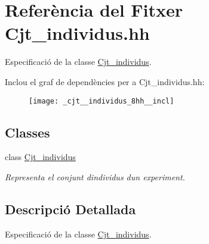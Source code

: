 \hypertarget{_cjt__individus_8hh}{}\section{Referència del Fitxer Cjt\+\_\+individus.\+hh}
\label{_cjt__individus_8hh}


Especificació de la classe \hyperlink{class_cjt__individus}{Cjt\+\_\+individus}.  


Inclou el graf de dependències per a Cjt\+\_\+individus.\+hh\+:
\nopagebreak
\begin{figure}[H]
\begin{center}
\leavevmode
\texttt{[image: \_cjt\_\_individus\_8hh\_\_incl]}
\end{center}
\end{figure}
\subsection*{Classes}
\begin{DoxyCompactItemize}
\item 
class \hyperlink{class_cjt__individus}{Cjt\+\_\+individus}
\begin{DoxyCompactList}\small\item\em Representa el conjunt d\textquotesingle{}individus d\textquotesingle{}un experiment. \end{DoxyCompactList}\end{DoxyCompactItemize}


\subsection{Descripció Detallada}
Especificació de la classe \hyperlink{class_cjt__individus}{Cjt\+\_\+individus}. 

